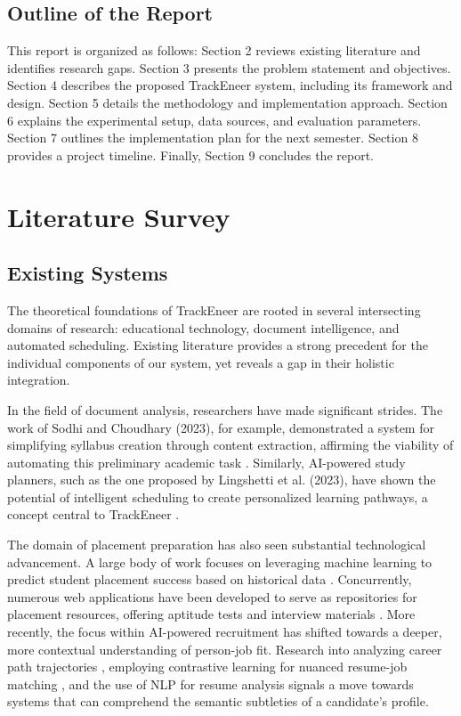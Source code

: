 \documentclass[12pt]{article}
\begin{document}
\subsection{Outline of the Report}
This report is organized as follows: Section 2 reviews existing literature and identifies research gaps. Section 3 presents the problem statement and objectives. Section 4 describes the proposed TrackEneer system, including its framework and design. Section 5 details the methodology and implementation approach. Section 6 explains the experimental setup, data sources, and evaluation parameters. Section 7 outlines the implementation plan for the next semester. Section 8 provides a project timeline. Finally, Section 9 concludes the report.

\section{Literature Survey}
\subsection{Existing Systems}
The theoretical foundations of TrackEneer are rooted in several intersecting domains of research: educational technology, document intelligence, and automated scheduling. Existing literature provides a strong precedent for the individual components of our system, yet reveals a gap in their holistic integration.

In the field of document analysis, researchers have made significant strides. The work of Sodhi and Choudhary (2023), for example, demonstrated a system for simplifying syllabus creation through content extraction, affirming the viability of automating this preliminary academic task \cite{b1}. Similarly, AI-powered study planners, such as the one proposed by Lingshetti et al. (2023), have shown the potential of intelligent scheduling to create personalized learning pathways, a concept central to TrackEneer \cite{b4}.

The domain of placement preparation has also seen substantial technological advancement. A large body of work focuses on leveraging machine learning to predict student placement success based on historical data \cite{b8}. Concurrently, numerous web applications have been developed to serve as repositories for placement resources, offering aptitude tests and interview materials \cite{b5, b6, b9}. More recently, the focus within AI-powered recruitment has shifted towards a deeper, more contextual understanding of person-job fit. Research into analyzing career path trajectories \cite{b11}, employing contrastive learning for nuanced resume-job matching \cite{b12}, and the use of NLP for resume analysis \cite{b13} signals a move towards systems that can comprehend the semantic subtleties of a candidate's profile.
\end{document}
